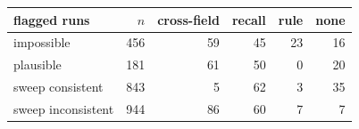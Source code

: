 \begin{tabular}{lrrrrr}
\toprule
flagged runs & $n$ & cross-field & recall & rule & none \\
\midrule
impossible & 456 & 59 & 45 & 23 & 16 \\
plausible & 181 & 61 & 50 & 0 & 20 \\
sweep consistent & 843 & 5 & 62 & 3 & 35 \\
sweep inconsistent & 944 & 86 & 60 & 7 & 7 \\
\bottomrule
\end{tabular}

